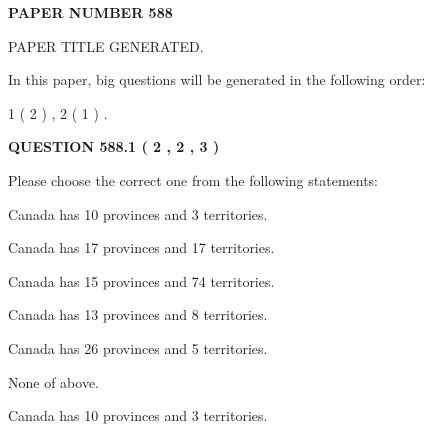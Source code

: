 \documentclass[12pt]{article}
\begin{document}
   
   
   
\newpage 
\setcounter{page}{ 
   588001 } 
   
   
   
   
 {\textbf{ \Large{ PAPER NUMBER  588  }}}
   
   
\vspace{0.2in}
   
   
   
   
   
   
   
   
 \vspace{0.2in}
 
 
 
 
   
   
 PAPER TITLE GENERATED.
   
   
   
\vspace{0.2in}
   
In this paper, big questions will be generated in the following order: 
   
   
   1 ( 2 )
 ,
   2 ( 1 )
 .
  
\vspace{0.2in}
  
{\textbf{\Large{QUESTION
588.1 
 ( 2 , 2 , 3 )
}}}
  
  
Please choose the correct one from the following statements:
 
 
Canada has 10  provinces and 3 territories.
 
 
Canada has  17 provinces and  17 territories.
 
 
Canada has  15 provinces and  74 territories.
 
 
Canada has  13 provinces and  8 territories.
 
 
Canada has  26 provinces and  5 territories.
 
 
 None of above.
 
 
\noindent{}
 
 
Canada has 10  provinces and 3 territories.
 
 
\noindent{}
 
\end{document}
